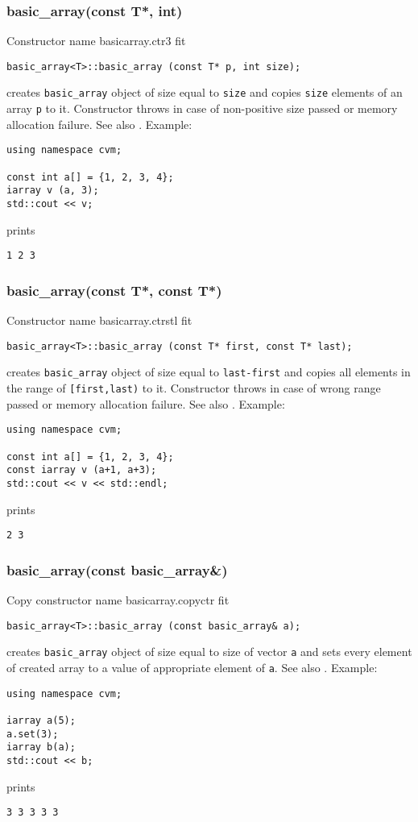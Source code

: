 \subsubsection{basic\_array(const T*, int)}
Constructor%
\pdfdest name {basicarray.ctr3} fit
\begin{verbatim}
basic_array<T>::basic_array (const T* p, int size);
\end{verbatim}
creates  \verb"basic_array" object of size equal to 
\verb"size" and copies \verb"size" elements of
an array \verb"p" to it.
Constructor throws  
in case of non-positive size passed or memory allocation failure.
See also .
Example:
\begin{Verbatim}
using namespace cvm;

const int a[] = {1, 2, 3, 4};
iarray v (a, 3);
std::cout << v;
\end{Verbatim}
prints
\begin{Verbatim}
1 2 3
\end{Verbatim}
\newpage


\subsubsection{basic\_array(const T*, const T*)}
Constructor%
\pdfdest name {basicarray.ctrstl} fit
\begin{verbatim}
basic_array<T>::basic_array (const T* first, const T* last);
\end{verbatim}
creates  \verb"basic_array" object of size equal to 
\verb"last-first" and copies all elements in the range
of \verb"[first,last)" to it.
Constructor throws 
in case of wrong range passed or memory allocation failure.
See also .
Example:
\begin{Verbatim}
using namespace cvm;

const int a[] = {1, 2, 3, 4};
const iarray v (a+1, a+3);
std::cout << v << std::endl;
\end{Verbatim}
prints
\begin{Verbatim}
2 3
\end{Verbatim}
\newpage


\subsubsection{basic\_array(const basic\_array\&)}
Copy constructor%
\pdfdest name {basicarray.copyctr} fit
\begin{verbatim}
basic_array<T>::basic_array (const basic_array& a);
\end{verbatim}
creates  \verb"basic_array" object of size equal to size of
vector \verb"a" and 
sets every element of created array to a value of
appropriate element of  \verb"a".
See also .
Example:
\begin{Verbatim}
using namespace cvm;

iarray a(5);
a.set(3);
iarray b(a);
std::cout << b;
\end{Verbatim}
prints
\begin{Verbatim}
3 3 3 3 3
\end{Verbatim}
\newpage



